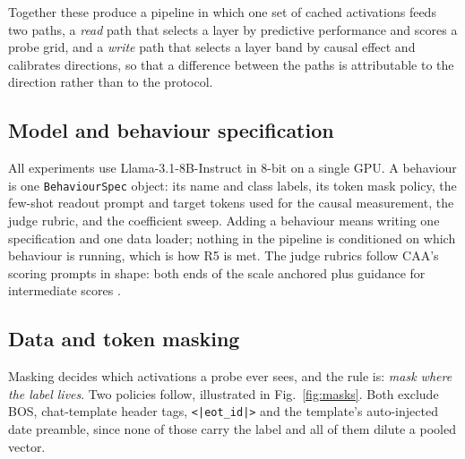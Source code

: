 \documentclass[conference]{IEEEtran}
\begin{document}
Together these produce a pipeline in which one set of cached activations feeds two
paths, a \emph{read} path that selects a layer by predictive performance and scores a
probe grid, and a \emph{write} path that selects a layer band by causal effect and
calibrates directions, so that a difference between the paths is attributable to the
direction rather than to the protocol.

\subsection{Model and behaviour specification}
All experiments use Llama-3.1-8B-Instruct in 8-bit on a single GPU. A behaviour
is one \texttt{BehaviourSpec} object: its name and class labels, its token mask
policy, the few-shot readout prompt and target tokens used for the causal
measurement, the judge rubric, and the coefficient sweep. Adding a behaviour
means writing one specification and one data loader; nothing in the pipeline is
conditioned on which behaviour is running, which is how R5 is met. The judge
rubrics follow CAA's scoring prompts in shape: both ends of the scale anchored
plus guidance for intermediate scores \citep{rimsky2024}.

\subsection{Data and token masking}
\label{sec:masking}

Masking decides which activations a probe ever sees, and the rule is: \emph{mask
where the label lives}. Two policies follow, illustrated in
Fig.~\ref{fig:masks}. Both exclude BOS, chat-template header tags,
\texttt{<|eot\_id|>} and the template's auto-injected date preamble, since none
of those carry the label and all of them dilute a pooled vector.
\end{document}
